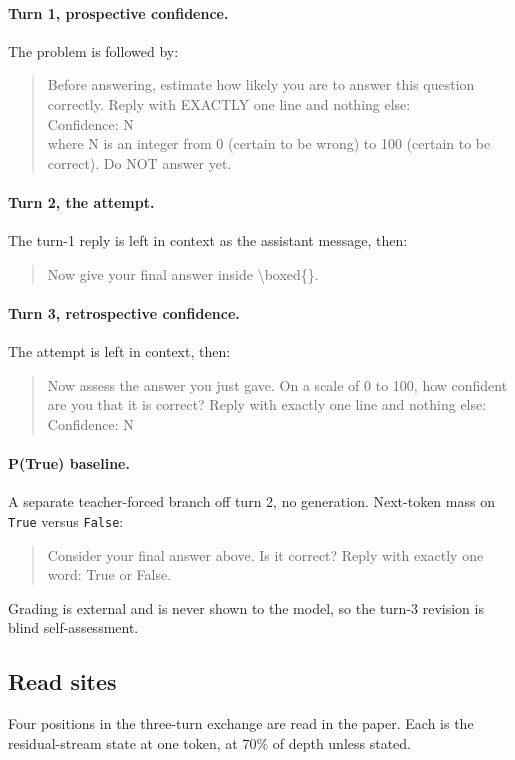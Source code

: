 \paragraph{Turn 1, prospective confidence.} The problem is followed by:
\begin{quote}\ttfamily\footnotesize
Before answering, estimate how likely you are to answer this question correctly. Reply with EXACTLY one line and nothing else:\\
Confidence: N\\
where N is an integer from 0 (certain to be wrong) to 100 (certain to be correct). Do NOT answer yet.
\end{quote}

\paragraph{Turn 2, the attempt.} The turn-1 reply is left in context as the assistant message, then:
\begin{quote}\ttfamily\footnotesize
Now give your final answer inside \textbackslash boxed\{\}.
\end{quote}

\paragraph{Turn 3, retrospective confidence.} The attempt is left in context, then:
\begin{quote}\ttfamily\footnotesize
Now assess the answer you just gave. On a scale of 0 to 100, how confident are you that it is correct? Reply with exactly one line and nothing else:\\
Confidence: N
\end{quote}

\paragraph{P(True) baseline.} A separate teacher-forced branch off turn 2, no generation.
Next-token mass on \texttt{True} versus \texttt{False}:
\begin{quote}\ttfamily\footnotesize
Consider your final answer above. Is it correct? Reply with exactly one word: True or False.
\end{quote}

Grading is external and is never shown to the model, so the turn-3 revision is blind
self-assessment.

\subsection{Read sites}
\label{app:sites}
Four positions in the three-turn exchange are read in the paper. Each is the residual-stream state at one token, at 70\% of depth unless stated.

